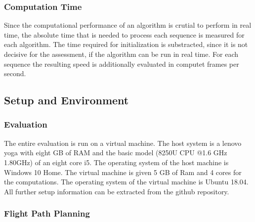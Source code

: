 \subsubsection{Computation Time}
	
	Since the computational performance of an algorithm is crutial to perform in real time, the absolute time that is needed to process each 
	sequence is measured for each algorithm. The time required for initialization is substracted, since it is not decisive for the assessment, 
	if the algorithm can be run in real time. For each sequence the resulting speed is additionally evaluated in computet frames per second. 
	
\subsection{Setup and Environment}

	\subsubsection{Evaluation}
	
	The entire evaluation is run on a virtual machine. The host system is a lenovo yoga with eight GB of RAM and the basic model (8250U CPU @1.6 
	GHz 1.80GHz) of an eight core i5. The operating system of the host machine is Windows 10 Home. The virtual
	machine is given 5 GB of Ram and 4 cores for the computations. The operating system of the virtual machine is Ubuntu 18.04. All further setup information can be extracted 
	from the github repository.

	\subsubsection{Flight Path Planning}